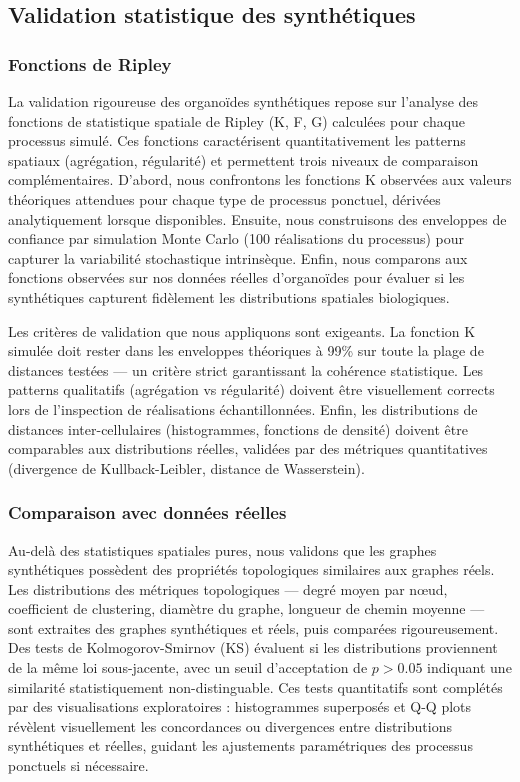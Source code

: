 \subsection{Validation statistique des synthétiques}

\subsubsection{Fonctions de Ripley}

La validation rigoureuse des organoïdes synthétiques repose sur l'analyse des fonctions de statistique spatiale de Ripley (K, F, G) calculées pour chaque processus simulé. Ces fonctions caractérisent quantitativement les patterns spatiaux (agrégation, régularité) et permettent trois niveaux de comparaison complémentaires. D'abord, nous confrontons les fonctions K observées aux valeurs théoriques attendues pour chaque type de processus ponctuel, dérivées analytiquement lorsque disponibles. Ensuite, nous construisons des enveloppes de confiance par simulation Monte Carlo (100 réalisations du processus) pour capturer la variabilité stochastique intrinsèque. Enfin, nous comparons aux fonctions observées sur nos données réelles d'organoïdes pour évaluer si les synthétiques capturent fidèlement les distributions spatiales biologiques.

Les critères de validation que nous appliquons sont exigeants. La fonction K simulée doit rester dans les enveloppes théoriques à 99\% sur toute la plage de distances testées — un critère strict garantissant la cohérence statistique. Les patterns qualitatifs (agrégation vs régularité) doivent être visuellement corrects lors de l'inspection de réalisations échantillonnées. Enfin, les distributions de distances inter-cellulaires (histogrammes, fonctions de densité) doivent être comparables aux distributions réelles, validées par des métriques quantitatives (divergence de Kullback-Leibler, distance de Wasserstein).

\subsubsection{Comparaison avec données réelles}

Au-delà des statistiques spatiales pures, nous validons que les graphes synthétiques possèdent des propriétés topologiques similaires aux graphes réels. Les distributions des métriques topologiques — degré moyen par nœud, coefficient de clustering, diamètre du graphe, longueur de chemin moyenne — sont extraites des graphes synthétiques et réels, puis comparées rigoureusement. Des tests de Kolmogorov-Smirnov (KS) évaluent si les distributions proviennent de la même loi sous-jacente, avec un seuil d'acceptation de $p > 0.05$ indiquant une similarité statistiquement non-distinguable. Ces tests quantitatifs sont complétés par des visualisations exploratoires : histogrammes superposés et Q-Q plots révèlent visuellement les concordances ou divergences entre distributions synthétiques et réelles, guidant les ajustements paramétriques des processus ponctuels si nécessaire.

